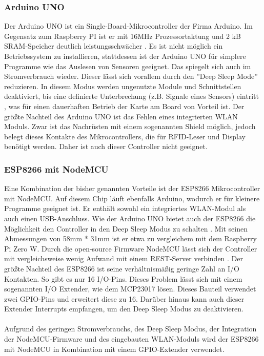 \documentclass[12pt,titlepage]{scrartcl}
\begin{document}
			\subsubsection{Arduino UNO} \label{uno}
			Der Arduino UNO ist ein Single-Board-Mikrocontroller der Firma Arduino. Im Gegensatz zum Raspberry PI ist er mit 16MHz Prozessortaktung und 2 kB SRAM-Speicher deutlich leistungsschwächer \cite{arduinounogeneral}. Es ist nicht möglich ein Betriebssystem zu installieren, stattdessen ist der Arduino UNO für simplere Programme wie das Auslesen von Sensoren geeignet. Das spiegelt sich auch im Stromverbrauch wieder. Dieser lässt sich vorallem durch den ''Deep Sleep Mode'' reduzieren. In diesem Modus werden ungenutzte Module und Schnittstellen deaktiviert, bis eine definierte Unterbrechung (z.B. Signale eines Sensors) eintritt \cite{arduinounosleep}, was für einen dauerhaften Betrieb der Karte am Board von Vorteil ist. Der größte Nachteil des Arduino UNO ist das Fehlen eines integrierten WLAN Moduls. Zwar ist das Nachrüsten mit einem sogenannten Shield möglich, jedoch belegt dieses Kontakte des Mikrocontrollers, die für RFID-Leser und Display benötigt werden. Daher ist auch dieser Controller nicht geeignet.			
			\subsubsection{ESP8266 mit NodeMCU}
			Eine Kombination der bisher genannten Vorteile ist der ESP8266 Mikrocontroller mit NodeMCU. Auf diesem Chip läuft ebenfalls Arduino, wodurch er für kleinere Programme geeignet ist. Er enthält sowohl ein integriertes WLAN-Modul als auch einen USB-Anschluss. Wie der Arduino UNO bietet auch der ESP8266 die Möglichkeit den Controller in den Deep Sleep Modus zu schalten \cite{esp8266general}. Mit seinen Abmessungen von 58mm * 31mm ist er etwa zu vergleichem mit dem Raspberry Pi Zero W. Durch die open-source Firmware NodeMCU lässt sich der Controller mit vergleichsweise wenig Aufwand mit einem REST-Server verbinden \cite{nodemcuexamples}. Der größte Nachteil des ESP8266 ist seine verhältnismäßig geringe Zahl an I/O Kontakten. So gibt es nur 16 I/O-Pins. Dieses Problem lässt sich mit einem sogenannten I/O Extender, wie dem MCP23017 lösen. Dieses Bauteil verwendet zwei GPIO-Pins und erweitert diese zu 16. Darüber hinaus kann auch dieser Extender Interrupts empfangen, um den Deep Sleep Modus zu deaktivieren. \\ \\
			Aufgrund des geringen Stromverbrauchs, des Deep Sleep Modus, der Integration der NodeMCU-Firmware und des eingebauten WLAN-Moduls wird der ESP8266 mit NodeMCU in Kombination mit einem GPIO-Extender verwendet.
\end{document}
